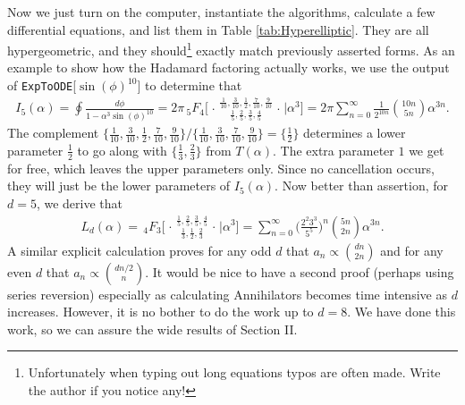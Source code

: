 \documentclass[nofootinbib,preprint]{revtex4-1}
\begin{document}
Now we just turn on the computer, instantiate the algorithms, calculate a few differential 
equations, and list them in Table \ref{tab:Hyperelliptic}.  They are all hypergeometric, and 
they should\footnote{Unfortunately when typing out long equations typos are often made. Write
the author if you notice any!} exactly match previously asserted forms. As an example to show how the Hadamard factoring 
actually works, we use the output of \texttt{ExpToODE}[$\sin(\phi)^{10}$] to determine that 
 \begin{eqnarray}
I_5(\alpha) = \oint \frac{d\phi}{1-\alpha^3\sin(\phi)^{10}} = 
2\pi\,_5F_4 \bigg[ \genfrac..{0pt}{}{
\frac{1}{10},\frac{3}{10},\frac{1}{2},\frac{7}{10},\frac{9}{10}
}{\frac{1}{5},\frac{2}{5},\frac{3}{5},\frac{4}{5}}\bigg| \alpha^3 \bigg]
= 2\pi \sum_{n=0}^{\infty} \frac{1}{2^{10n}}\binom{10n}{5n}\alpha^{3n}.
\nonumber
\end{eqnarray}
The complement $\{\frac{1}{10},\frac{3}{10},\frac{1}{2},\frac{7}{10},\frac{9}{10}\}/
\{\frac{1}{10},\frac{3}{10},\frac{7}{10},\frac{9}{10}\}=\{\frac{1}{2}\}$ determines
a lower parameter $\frac{1}{2}$ to go along with $\{\frac{1}{3},\frac{2}{3}\}$ from 
$T(\alpha)$. The extra parameter $1$ we get for free, which leaves the upper parameters
only. Since no cancellation occurs, they will just be the lower parameters of $I_5(\alpha)$.
Now better than assertion, for $d=5$, we derive that
\begin{eqnarray}
L_d(\alpha)= \,_4F_3 \bigg[ \genfrac..{0pt}{}{
\frac{1}{5},\frac{2}{5},\frac{3}{5},\frac{4}{5}
}{\frac{1}{3},\frac{1}{2},\frac{2}{3}}\bigg| \alpha^3 \bigg]
=  \sum_{n=0}^{\infty} \bigg(\frac{2^{2}3^3}{5^5}\bigg)^n\binom{5n}{2n}\alpha^{3n}.
\nonumber
\end{eqnarray}   
A similar explicit calculation proves for any odd $d$ that $a_n \propto \binom{d n}{2n}$ and 
for any even $d$ that $a_n \propto \binom{d n/2}{n}$. It would be nice to have a second proof  
(perhaps using series reversion) especially as calculating Annihilators becomes time intensive
as $d$ increases. However, it is no bother to do the work up to $d=8$. We have done this 
work, so we can assure the wide results of Section II.
\end{document}
